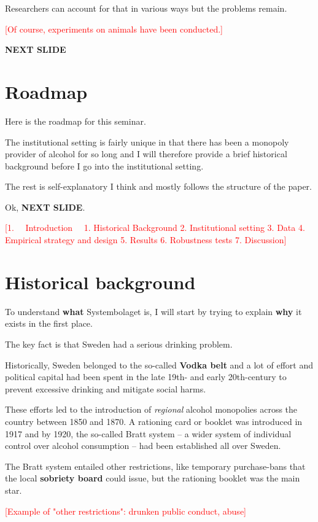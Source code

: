 \documentclass[12pt]{article}
\newcommand{\TODO}[1]{\textcolor{red}{[#1]}}
\begin{document}
Researchers can account for that in various ways but the problems remain.


\TODO{Of course, experiments on animals have been conducted.}

\textbf{NEXT SLIDE}
\section{Roadmap}

Here is the roadmap for this seminar.

The institutional setting is fairly unique in that there has been a monopoly provider of alcohol for so long and I will therefore provide a brief historical background before I go into the institutional setting. 

The rest is self-explanatory I think and mostly follows the structure of the paper.

Ok, \textbf{NEXT SLIDE}.

\TODO{1. ~~Introduction~~
1.  Historical Background 
2.  Institutional setting
3.  Data
4.  Empirical strategy and design
5.  Results
6.  Robustness tests
7.  Discussion}



\section{Historical background}

To understand  \textbf{what}  Systembolaget is, I will start by trying to explain  \textbf{why}  it exists in the first place. 

The key fact is that Sweden had a serious drinking problem. 

Historically, Sweden belonged to the so-called \textbf{Vodka belt} and a lot of effort and political capital had been spent in the late 19th- and early 20th-century to prevent excessive drinking and mitigate social harms.

These efforts led to the introduction of \emph{regional}  alcohol monopolies across the country between 1850 and 1870. A rationing card or booklet was introduced in 1917 and by 1920, the so-called Bratt system -- a wider system of individual control over alcohol consumption -- had been established all over Sweden. 

The Bratt system entailed other restrictions, like temporary purchase-bans that the local  \textbf{sobriety board}  could issue, but the rationing booklet was the main star.

\TODO{Example of "other restrictions": drunken public conduct, abuse}
\end{document}
